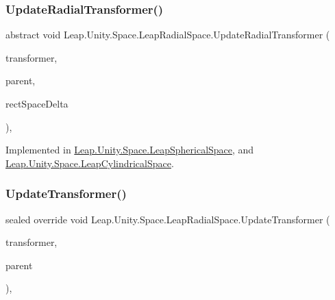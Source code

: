 \subsubsection{\texorpdfstring{UpdateRadialTransformer()}{UpdateRadialTransformer()}}
{\footnotesize\ttfamily abstract void Leap.\+Unity.\+Space.\+Leap\+Radial\+Space.\+Update\+Radial\+Transformer (\begin{DoxyParamCaption}\item[{\mbox{\hyperlink{interface_leap_1_1_unity_1_1_space_1_1_i_transformer}{I\+Transformer}}}]{transformer,  }\item[{\mbox{\hyperlink{interface_leap_1_1_unity_1_1_space_1_1_i_transformer}{I\+Transformer}}}]{parent,  }\item[{Vector3}]{rect\+Space\+Delta }\end{DoxyParamCaption})\hspace{0.3cm}{\ttfamily [protected]}, {}}



Implemented in \mbox{\hyperlink{class_leap_1_1_unity_1_1_space_1_1_leap_spherical_space_aaae3bed7e24ee9a7ccc564ff19888419}{Leap.\+Unity.\+Space.\+Leap\+Spherical\+Space}}, and \mbox{\hyperlink{class_leap_1_1_unity_1_1_space_1_1_leap_cylindrical_space_aaf93c86d6ae53e212049898f2bb2a2cf}{Leap.\+Unity.\+Space.\+Leap\+Cylindrical\+Space}}.

\mbox{\label{class_leap_1_1_unity_1_1_space_1_1_leap_radial_space_a9214f2211d8c755878962cc0a23e6168}} 
\subsubsection{\texorpdfstring{UpdateTransformer()}{UpdateTransformer()}}
{\footnotesize\ttfamily sealed override void Leap.\+Unity.\+Space.\+Leap\+Radial\+Space.\+Update\+Transformer (\begin{DoxyParamCaption}\item[{\mbox{\hyperlink{interface_leap_1_1_unity_1_1_space_1_1_i_transformer}{I\+Transformer}}}]{transformer,  }\item[{\mbox{\hyperlink{interface_leap_1_1_unity_1_1_space_1_1_i_transformer}{I\+Transformer}}}]{parent }\end{DoxyParamCaption})\hspace{0.3cm}{\ttfamily [protected]}, {\ttfamily [virtual]}}



